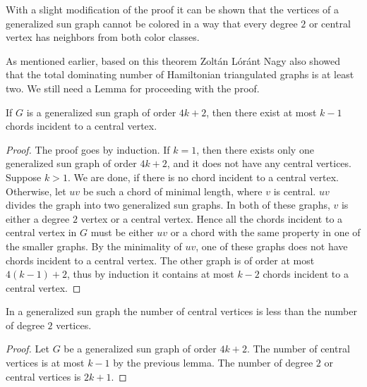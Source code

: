 \begin{remark}
  With a slight modification of the proof it can be shown that the vertices of a
  generalized sun graph cannot be colored in a way that every degree $2$ or central
  vertex has neighbors from both color classes.
\end{remark}

As mentioned earlier, based on this theorem Zoltán Lóránt Nagy \cite{outerplanar}
also showed that the total dominating number of Hamiltonian triangulated graphs
is at least two. We still need a Lemma for proceeding with the proof.

\begin{lemma}\label{lem:central}
  If $G$ is a generalized sun graph of order $4k + 2$, then there exist at most
  $k - 1$ chords incident to a central vertex.
\end{lemma}
\begin{proof}
  The proof goes by induction. If $k = 1$, then there exists only one generalized sun graph
  of order $4k + 2$, and it does not have any central vertices. Suppose $k > 1$.
  We are done, if there is no chord incident to a central vertex. Otherwise, let $uv$ be
  such a chord of minimal length, where $v$ is central. $uv$ divides the graph into
  two generalized sun graphs. In both of these graphs, $v$ is either a degree $2$
  vertex or a central vertex. Hence all the chords incident to a central vertex in $G$
  must be either $uv$ or a chord with the same property in one of the smaller graphs.
  By the minimality of $uv$, one of these graphs does not have chords incident to
  a central vertex. The other graph is of order at most $4(k - 1) + 2$, thus by induction
  it contains at most $k - 2$ chords incident to a central vertex.
\end{proof}

\begin{cor} \label{col:degree2}
  In a generalized sun graph the number of central vertices is less than the number
  of degree $2$ vertices.
\end{cor}
\begin{proof}
  Let $G$ be a generalized sun graph of order $4k + 2$. The number of central
  vertices is at most $k - 1$ by the previous lemma. The number of degree $2$ or
  central vertices is $2k + 1$.
\end{proof}

